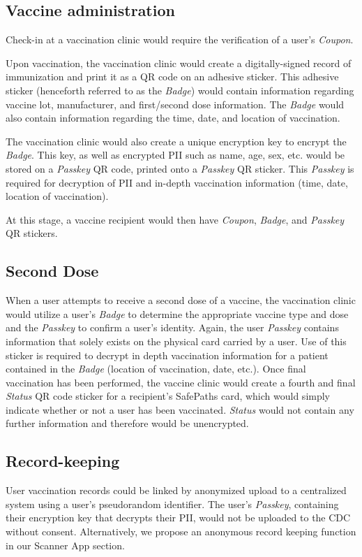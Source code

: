 \subsection{Vaccine administration}
Check-in at a vaccination clinic would require the verification  of a user’s \textit{Coupon}. 

Upon vaccination, the vaccination clinic would create a digitally-signed record of immunization and print it as a QR code on an adhesive sticker. This adhesive sticker (henceforth referred to as the \textit{Badge}) would contain information regarding vaccine lot, manufacturer, and first/second dose information. The \textit{Badge} would also contain information regarding the time, date, and location of vaccination. 

The vaccination clinic would also create a unique encryption key to encrypt the \textit{Badge}. This key, as well as encrypted PII such as name, age, sex, etc. would be stored on a \textit{Passkey} QR code, printed onto a \textit{Passkey} QR sticker. This \textit{Passkey} is required for decryption of PII and in-depth vaccination information (time, date, location of vaccination). 

At this stage, a vaccine recipient would then have \textit{Coupon}, \textit{Badge}, and \textit{Passkey} QR stickers. 


\subsection{Second Dose}
When a user attempts to receive a second dose of a vaccine, the vaccination clinic would  utilize a user’s \textit{Badge} to determine the appropriate vaccine type and dose and the \textit{Passkey} to confirm a user’s identity. Again, the user \textit{Passkey} contains information that solely exists on the physical card carried by a user. Use of this sticker is required to decrypt in depth vaccination information for a patient contained in the \textit{Badge} (location of vaccination, date, etc.). Once final vaccination has been performed, the vaccine clinic would create a fourth and final \textit{Status} QR code sticker for a recipient’s SafePaths card, which would simply indicate whether or not a user has been vaccinated. \textit{Status} would not contain any further information and therefore would be unencrypted.  
\subsection{Record-keeping}
User vaccination records could be linked by anonymized upload to a centralized system using a user’s pseudorandom identifier. The user’s \textit{Passkey}, containing their encryption key that decrypts their PII, would not be uploaded to the CDC without consent. Alternatively, we propose an anonymous record keeping function in our Scanner App section. 

